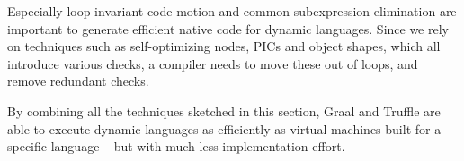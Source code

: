 Especially loop-invariant code motion and common subexpression elimination are important
to generate efficient native code for dynamic languages.
Since we rely on techniques such as self-optimizing nodes, PICs and object shapes,
which all introduce various checks,
a compiler needs to move these out of loops, and remove redundant checks.

By combining all the techniques sketched in this section,
Graal and Truffle are able to execute dynamic languages as efficiently
as virtual machines built for a specific language -- but with much
less implementation effort.

